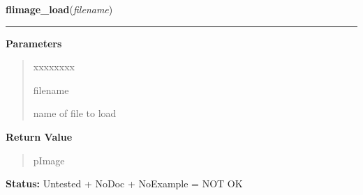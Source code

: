     \label{xformslib:library:flimage_load}

    \vspace{0.5ex}

\hspace{.8\funcindent}\begin{boxedminipage}{\funcwidth}

    \raggedright \textbf{flimage\_load}(\textit{filename})

    \vspace{-1.5ex}

    \rule{\textwidth}{0.5\fboxrule}
\setlength{\parskip}{2ex}
\setlength{\parskip}{1ex}
      \textbf{Parameters}
      \vspace{-1ex}

      \begin{quote}
        \begin{Ventry}{xxxxxxxx}

          \item[filename]

          name of file to load

        \end{Ventry}

      \end{quote}

      \textbf{Return Value}
    \vspace{-1ex}

      \begin{quote}
      pImage

      \end{quote}

\textbf{Status:} Untested + NoDoc + NoExample = NOT OK



    \end{boxedminipage}

    \label{xformslib:library:flimage_read}

    \vspace{0.5ex}

